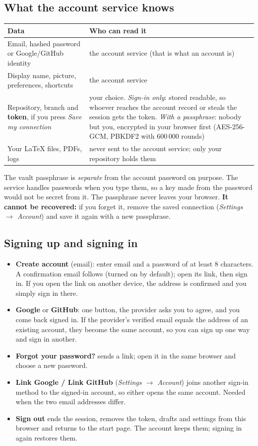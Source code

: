 \documentclass[11pt,a4paper]{article}
\begin{document}
\subsection{What the account service knows}
\begin{center}
\begin{tabular}{@{}L{5.3cm}L{9.6cm}@{}}
\toprule
\textbf{Data} & \textbf{Who can read it}\\\midrule
Email, hashed password or Google/GitHub identity & the account service (that is what an account is)\\
Display name, picture, preferences, shortcuts & the account service\\
Repository, branch and \textbf{token}, if you press \emph{Save my connection} & your choice. \emph{Sign-in only}: stored readable, so whoever reaches the account record or steals the session gets the token. \emph{With a passphrase}: nobody but you, encrypted in your browser first (AES-256-GCM, PBKDF2 with 600\,000 rounds)\\
Your \LaTeX{} files, PDFs, logs & never sent to the account service; only your repository holds them\\
\bottomrule
\end{tabular}
\end{center}
The vault passphrase is \emph{separate} from the account password on purpose. The service handles passwords when you type them, so a key made from the
password would not be secret from it. The passphrase never leaves your browser. \textbf{It cannot be recovered:} if you forget it, remove the saved connection
(\emph{Settings $\rightarrow$ Account}) and save it again with a new passphrase.

\subsection{Signing up and signing in}
\begin{itemize}
  \item \textbf{Create account} (email): enter email and a password of at least 8 characters. A confirmation email follows (turned on by default); open its
        link, then sign in. If you open the link on another device, the address is confirmed and you simply sign in there.
  \item \textbf{Google} or \textbf{GitHub}: one button, the provider asks you to agree, and you come back signed in. If the provider's verified email equals the
        address of an existing account, they become the same account, so you can sign up one way and sign in another.
  \item \textbf{Forgot your password?} sends a link; open it in the same browser and choose a new password.
  \item \textbf{Link Google / Link GitHub} (\emph{Settings $\rightarrow$ Account}) joins another sign-in method to the signed-in account, so either opens the same account. Needed when the two email addresses differ.
  \item \textbf{Sign out} ends the session, removes the token, drafts and settings from this browser and returns to the start page. The account keeps them; signing in again restores them.
\end{itemize}
\end{document}
